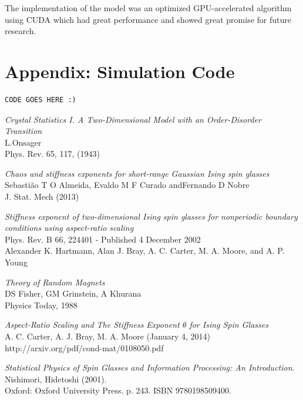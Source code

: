 \documentclass[paper=a4, fontsize=11pt]{scrartcl} %
\numberwithin{equation}{section} %
\numberwithin{figure}{section} %
\numberwithin{table}{section} %
\begin{document}
The implementation of the model was an optimized GPU-accelerated algorithm using CUDA which had great performance and showed great promise for future research.

\pagebreak
\section*{Appendix: Simulation Code}
\begin{lstlisting}
CODE GOES HERE :)
\end{lstlisting}

\pagebreak

\begin{thebibliography}{100}

\textit{Crystal Statistics I. A Two-Dimensional Model with an Order-Disorder Transition} \\
L.Onsager \\
Phys. Rev. 65, 117, (1943)

\textit{Chaos and stiffness exponents for short-range Gaussian Ising spin glasses} \\
Sebasti\~{a}o T O Almeida, Evaldo M F Curado andFernando D Nobre \\
J. Stat. Mech (2013)

\textit{Stiffness exponent of two-dimensional Ising spin glasses for nonperiodic boundary conditions using aspect-ratio scaling} \\
Phys. Rev. B 66, 224401 - Published 4 December 2002 \\
Alexander K. Hartmann, Alan J. Bray, A. C. Carter, M. A. Moore, and A. P. Young

\textit{Theory of Random Magnets} \\
DS Fisher, GM Grinstein, A Khurana \\
Physics Today, 1988 

\textit{Aspect-Ratio Scaling and The Stiffness Exponent $\theta$ for Ising Spin Glasses} \\
A. C. Carter, A. J. Bray, M. A. Moore (January 4, 2014) \\
http://arxiv.org/pdf/cond-mat/0108050.pdf

\textit{Statistical Physics of Spin Glasses and Information Processing: An Introduction.} \\
Nishimori, Hidetoshi (2001). \\
Oxford: Oxford University Press. p. 243. ISBN 9780198509400.


\end{thebibliography}
\end{document}
